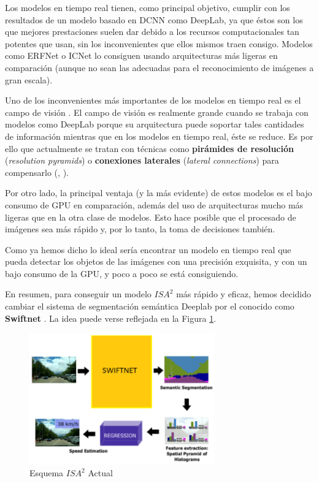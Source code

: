Los modelos en tiempo real tienen, como principal objetivo, cumplir con los resultados de un modelo basado en \ac{DCNN} como DeepLab, ya que éstos son los que mejores prestaciones suelen dar debido a los recursos computacionales tan potentes que usan, sin los inconvenientes que ellos mismos traen consigo. Modelos como ERFNet \cite{erfnet} o ICNet \cite{icnet} lo consiguen usando arquitecturas más ligeras en comparación (aunque no sean las adecuadas para el reconocimiento de imágenes a gran escala).

Uno de los inconvenientes más importantes de los modelos en tiempo real es el campo de visión \cite{swiftnet}. El campo de visión es realmente grande cuando se trabaja con modelos como DeepLab porque su arquitectura puede soportar tales cantidades de información mientras que en los modelos en tiempo real, éste se reduce. Es por ello que actualmente se tratan con técnicas como \textbf{pirámides de resolución} (\textit{resolution pyramids}) o \textbf{conexiones laterales} (\textit{lateral connections}) para compensarlo (\cite{res_pyr}, \cite{lat_con}).

Por otro lado, la principal ventaja (y la más evidente) de estos modelos es el bajo consumo de GPU en comparación, además del uso de arquitecturas mucho más ligeras que en la otra clase de modelos. Esto hace posible que el procesado de imágenes sea más rápido y, por lo tanto, la toma de decisiones también.

Como ya hemos dicho lo ideal sería encontrar un modelo en tiempo real que pueda detectar los objetos de las imágenes con una precisión exquisita, y con un bajo consumo de la GPU, y poco a poco se está consiguiendo.


En resumen, para conseguir un modelo $ISA^{2}$ más rápido y eficaz, hemos decidido cambiar el sistema de segmentación semántica Deeplab por el conocido como \textbf{Swiftnet} \cite{swiftnet}. La idea puede verse reflejada en la Figura \ref{fig:Isa_v2}.

\begin{figure}[H]
  \centering
  \includegraphics[width=8cm]{Figuras/Figura_Esquema_ISA2_Version_2.eps}
  \caption{Esquema $ISA^{2}$ Actual}
    \label{fig:Isa_v2}
\end{figure}


